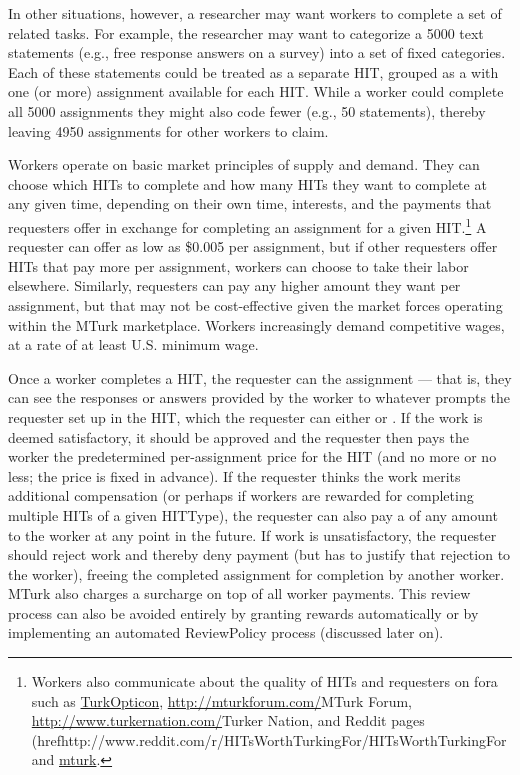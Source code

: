 In other situations, however, a researcher may want workers to complete a set of related tasks. For example, the researcher may want to categorize a 5000 text statements (e.g., free response answers on a survey) into a set of fixed categories. Each of these statements could be treated as a separate HIT, grouped as a  with one (or more) assignment available for each HIT. While a worker could complete all 5000 assignments they might also code fewer (e.g., 50 statements), thereby leaving 4950 assignments for other workers to claim.

Workers operate on basic market principles of supply and demand. They can choose which HITs to complete and how many HITs they want to complete at any given time, depending on their own time, interests, and the payments that requesters offer in exchange for completing an assignment for a given HIT.\footnote{Workers also communicate about the quality of HITs and requesters on fora such as \href{http://turkopticon.differenceengines.com/}{TurkOpticon}, \url{http://mturkforum.com/}{MTurk Forum}, \url{http://www.turkernation.com/}{Turker Nation}, and Reddit pages (href{http://www.reddit.com/r/HITsWorthTurkingFor/}{HITsWorthTurkingFor} and \href{http://www.reddit.com/r/mturk}{mturk}.} A requester can offer as low as \$0.005 per assignment, but if other requesters offer HITs that pay more per assignment, workers can choose to take their labor elsewhere. Similarly, requesters can pay any higher amount they want per assignment, but that may not be cost-effective given the market forces operating within the MTurk marketplace. Workers increasingly demand  competitive wages, at a rate of at least U.S. minimum wage.

Once a worker completes a HIT, the requester can  the assignment --- that is, they can see the responses or answers provided by the worker to whatever prompts the requester set up in the HIT, which the requester can either  or . If the work is deemed satisfactory, it should be approved and the requester then pays the worker the predetermined per-assignment price for the HIT (and no more or no less; the price is fixed in advance). If the requester thinks the work merits additional compensation (or perhaps if workers are rewarded for completing multiple HITs of a given HITType), the requester can also pay a  of any amount to the worker at any point in the future. If work is unsatisfactory, the requester should reject work and thereby deny payment (but has to justify that rejection to the worker), freeing the completed assignment for completion by another worker. MTurk also charges a surcharge on top of all worker payments. This review process can also be avoided entirely by granting rewards automatically or by implementing an automated ReviewPolicy process (discussed later on).

